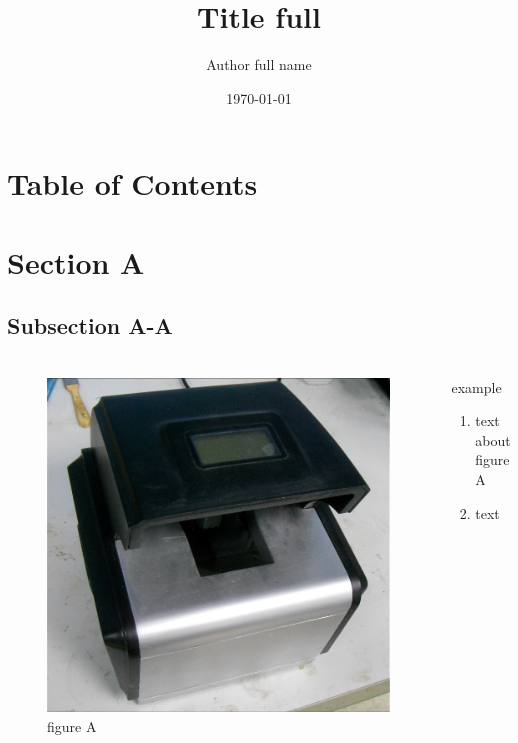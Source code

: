 \documentclass{beamer}
\begin{document}
\title[Title short]{Title full}
\author[Author short name]{Author full name}
\date{\today}
\frame{\titlepage}


\section*{Table of Contents}
\frame {
  \frametitle{\secname}
  \tableofcontents
}


\section{Section A}

\subsection{Subsection A-A}

\begin{frame}
\frametitle{\subsecname}
  \begin{columns}
    \begin{figure}
    \includegraphics[width=\textwidth]{image/test-image1}
    \caption{figure A}
    \end{figure}
    \begin{block}{example}
      \begin{enumerate}
        \item<alert@1>
        text about figure A
        \item
        text
      \end{enumerate}
    \end{block}
  \end{columns}
\end{frame}
\end{document}
